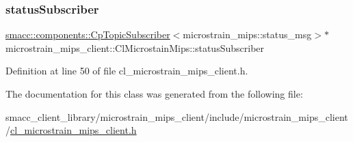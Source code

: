 \mbox{\label{classmicrostrain__mips__client_1_1ClMicrostainMips_ac35f8c095ccda178eb68bb94c705c024}} 
\subsubsection{\texorpdfstring{status\+Subscriber}{statusSubscriber}}
{\footnotesize\ttfamily \hyperlink{classsmacc_1_1components_1_1CpTopicSubscriber}{smacc\+::components\+::\+Cp\+Topic\+Subscriber}$<$microstrain\+\_\+mips\+::status\+\_\+msg$>$$\ast$ microstrain\+\_\+mips\+\_\+client\+::\+Cl\+Microstain\+Mips\+::status\+Subscriber}



Definition at line 50 of file cl\+\_\+microstrain\+\_\+mips\+\_\+client.\+h.



The documentation for this class was generated from the following file\+:\begin{DoxyCompactItemize}
\item 
smacc\+\_\+client\+\_\+library/microstrain\+\_\+mips\+\_\+client/include/microstrain\+\_\+mips\+\_\+client/\hyperlink{cl__microstrain__mips__client_8h}{cl\+\_\+microstrain\+\_\+mips\+\_\+client.\+h}\end{DoxyCompactItemize}
